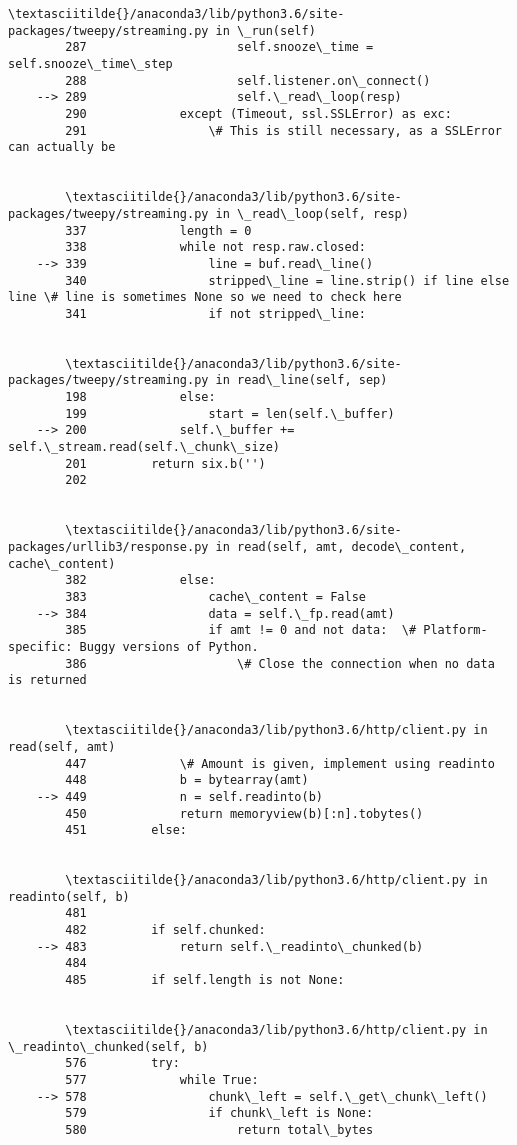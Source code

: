 \documentclass[11pt]{article}
\begin{document}
\begin{Verbatim}[commandchars=\\\{\}]
        \textasciitilde{}/anaconda3/lib/python3.6/site-packages/tweepy/streaming.py in \_run(self)
        287                     self.snooze\_time = self.snooze\_time\_step
        288                     self.listener.on\_connect()
    --> 289                     self.\_read\_loop(resp)
        290             except (Timeout, ssl.SSLError) as exc:
        291                 \# This is still necessary, as a SSLError can actually be


        \textasciitilde{}/anaconda3/lib/python3.6/site-packages/tweepy/streaming.py in \_read\_loop(self, resp)
        337             length = 0
        338             while not resp.raw.closed:
    --> 339                 line = buf.read\_line()
        340                 stripped\_line = line.strip() if line else line \# line is sometimes None so we need to check here
        341                 if not stripped\_line:


        \textasciitilde{}/anaconda3/lib/python3.6/site-packages/tweepy/streaming.py in read\_line(self, sep)
        198             else:
        199                 start = len(self.\_buffer)
    --> 200             self.\_buffer += self.\_stream.read(self.\_chunk\_size)
        201         return six.b('')
        202 


        \textasciitilde{}/anaconda3/lib/python3.6/site-packages/urllib3/response.py in read(self, amt, decode\_content, cache\_content)
        382             else:
        383                 cache\_content = False
    --> 384                 data = self.\_fp.read(amt)
        385                 if amt != 0 and not data:  \# Platform-specific: Buggy versions of Python.
        386                     \# Close the connection when no data is returned


        \textasciitilde{}/anaconda3/lib/python3.6/http/client.py in read(self, amt)
        447             \# Amount is given, implement using readinto
        448             b = bytearray(amt)
    --> 449             n = self.readinto(b)
        450             return memoryview(b)[:n].tobytes()
        451         else:


        \textasciitilde{}/anaconda3/lib/python3.6/http/client.py in readinto(self, b)
        481 
        482         if self.chunked:
    --> 483             return self.\_readinto\_chunked(b)
        484 
        485         if self.length is not None:


        \textasciitilde{}/anaconda3/lib/python3.6/http/client.py in \_readinto\_chunked(self, b)
        576         try:
        577             while True:
    --> 578                 chunk\_left = self.\_get\_chunk\_left()
        579                 if chunk\_left is None:
        580                     return total\_bytes



\end{Verbatim}
\end{document}
